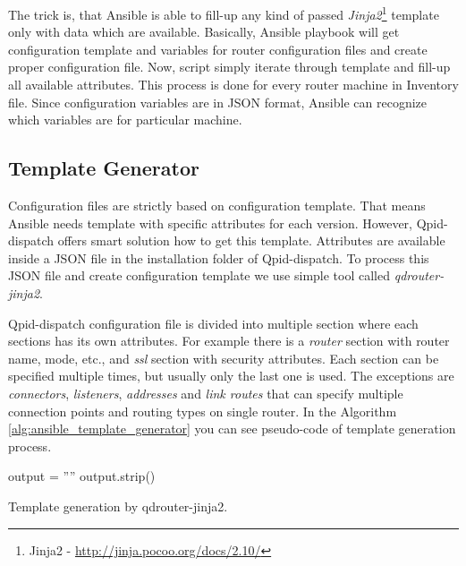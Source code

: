 The trick is, that Ansible is able to fill-up any kind of passed \emph{Jinja2}\footnote{Jinja2 - \url{http://jinja.pocoo.org/docs/2.10/}} template only with data which are available. Basically, Ansible playbook will get configuration template and variables for router configuration files and create proper configuration file. Now, script simply iterate through template and fill-up all available attributes. This process is done for every router machine in Inventory file. Since configuration variables are in JSON format, Ansible can recognize which variables are for particular machine.

\subsection{Template Generator}
Configuration files are strictly based on configuration template. That means Ansible needs template with specific attributes for each version. However, Qpid-dispatch offers smart solution how to get this template. Attributes are available inside a JSON file in the installation folder of Qpid-dispatch. To process this JSON file and create configuration template we use simple tool called \emph{qdrouter-jinja2}\footnotemark{}.


Qpid-dispatch configuration file is divided into multiple section where each sections has its own attributes. For example there is a \emph{router} section with router name, mode, etc., and \emph{ssl} section with security attributes. Each section can be specified multiple times, but usually only the last one is used. The exceptions are \emph{connectors}, \emph{listeners}, \emph{addresses} and \emph{link routes} that can specify multiple connection points and routing types on single router. In the Algorithm \ref{alg:ansible_template_generator} you can see pseudo-code of template generation process.

\begin{center}
	\begin{algorithm}[H]
		\LinesNumbered
		\DontPrintSemicolon


		\var output = ''''\;
		output.strip()\;
		\caption{Template generation by qdrouter-jinja2.}
		\label{alg:ansible_template_generator}
	\end{algorithm}
\end{center}

